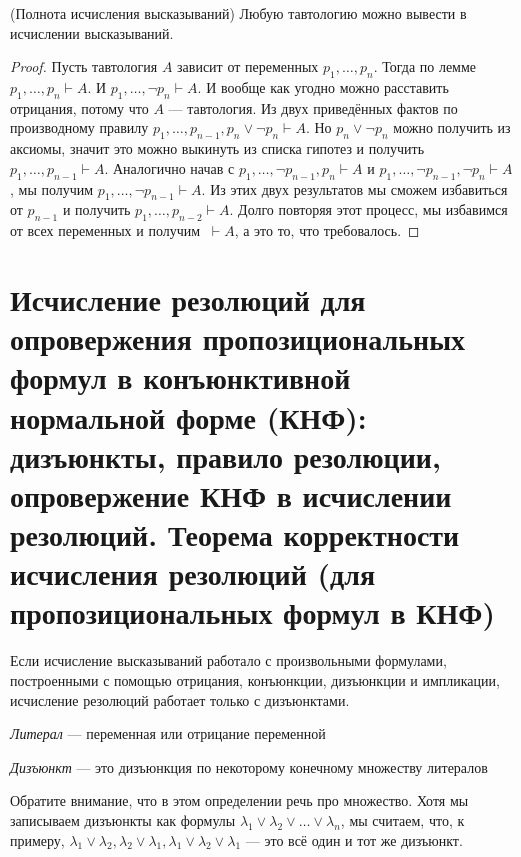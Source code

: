 \documentclass{article}
\begin{document}
\begin{theorem}{(Полнота исчисления высказываний)}
	Любую тавтологию можно вывести в исчислении высказываний.
\end{theorem}

\begin{proof}
	Пусть тавтология $A$ зависит от переменных $p_1, \ldots, p_n$. Тогда по лемме $p_1, \ldots, p_n \vdash A$. И $p_1, \ldots, \lnot p_n \vdash A$. И вообще как угодно можно расставить отрицания, потому что $A$ --- тавтология. Из двух приведённых фактов по производному правилу $p_1, \ldots, p_{n - 1}, p_n \lor \lnot p_n \vdash A$. Но $p_n \lor \lnot p_n$ можно получить из аксиомы, значит это можно выкинуть из списка гипотез и получить $p_1, \ldots, p_{n - 1} \vdash A$. Аналогично начав с $p_1, \ldots, \lnot p_{n - 1}, p_n \vdash A$ и $p_1, \ldots, \lnot p_{n - 1}, \lnot p_n \vdash A$, мы получим $p_1, \ldots, \lnot p_{n - 1} \vdash A$. Из этих двух результатов мы сможем избавиться от $p_{n - 1}$ и получить $p_1, \ldots, p_{n - 2} \vdash A$. Долго повторяя этот процесс, мы избавимся от всех переменных и получим $\ \vdash A$, а это то, что требовалось.  
\end{proof}

\section{Исчисление резолюций для опровержения пропозициональных формул в конъюнктивной нормальной форме (КНФ): дизъюнкты, правило резолюции, опровержение КНФ в исчислении резолюций. Теорема корректности исчисления резолюций (для пропозициональных формул в КНФ)}
Если исчисление высказываний работало с произвольными формулами, построенными с помощью отрицания, конъюнкции, дизъюнкции и импликации, исчисление резолюций работает только с дизъюнктами.

\begin{definition} \textit{Литерал} --- переменная или отрицание переменной \end{definition}
\begin{definition} \textit{Дизъюнкт} --- это дизъюнкция по некоторому конечному множеству литералов \end{definition}

Обратите внимание, что в этом определении речь про множество. Хотя мы записываем дизъюнкты как формулы $\lambda_1 \lor \lambda_2 \lor \ldots \lor \lambda_n$, мы считаем, что, к примеру, $\lambda_1 \lor \lambda_2, \lambda_2 \lor \lambda_1, \lambda_1 \lor \lambda_2 \lor \lambda_1$ --- это всё один и тот же дизъюнкт.
\end{document}
